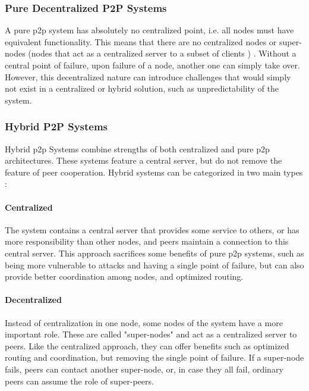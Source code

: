 \subsubsection{Pure Decentralized P2P Systems}
\label{sssec:pure_decentralized_p2p_systems}

A pure \gls{p2p} system has absolutely no centralized point, i.e. all nodes must have equivalent functionality. This means that there are no centralized nodes or super-nodes (nodes that act
as a centralized server to a subset of clients \cite{Yang2003}) \cite{Pourebrahimi2005}. Without a central point of failure, upon failure of a node, another one can simply take over. However, this decentralized nature can introduce challenges that would simply not exist in a centralized or hybrid solution, such as unpredictability of the system.

\subsubsection{Hybrid P2P Systems}
\label{sssec:hybrid_p2p_systems}

Hybrid \gls{p2p} Systems combine strengths of both centralized and pure \gls{p2p} architectures. These systems feature a central server, but do not remove the feature of peer cooperation. Hybrid systems can be categorized in two main types \cite{Pourebrahimi2005}:

\paragraph{Centralized} The system contains a central server that provides some service to others, or has more responsibility than other nodes, and peers maintain a connection to this central server. This approach sacrifices some benefits of pure \gls{p2p} systems, such as being more vulnerable to attacks and having a single point of failure, but can also provide better coordination among nodes, and optimized routing.

\paragraph{Decentralized} Instead of centralization in one node, some nodes of the system have a more important role. These are called "super-nodes" and act as a centralized server to peers. Like the centralized approach, they can offer benefits such as optimized routing and coordination, but removing the single point of failure. If a super-node fails, peers can contact another super-node, or, in case they all fail, ordinary peers can assume the role of super-peers.

